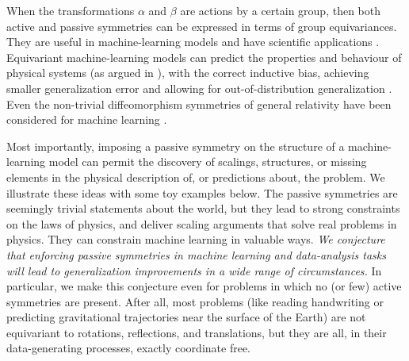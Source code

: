 \documentclass[11pt]{article}
\begin{document}
When the transformations $\alpha$ and $\beta$ are actions by a certain group, then both active and passive symmetries can be expressed in terms of group equivariances.
They are useful in machine-learning models \cite{cohen2016group, kondor2018convolution, thomas2018tensor, geiger2022e3nn, finzi2020generalizing, finzi2021practical} and have scientific applications \cite{batzner20223, musaelian2022learning, stark2022equibind, yu-physics, wang2022approximately}.
Equivariant machine-learning models can predict the properties and behaviour of physical systems (as argued in \cite{cheng2019covariance}), with the correct inductive bias, achieving smaller generalization error \cite{bietti2021sample, elesedy2021provably, elesedy2021kernel, mei2021learning} and allowing for out-of-distribution generalization \cite{villar2022dimensionless}. 
Even the non-trivial diffeomorphism symmetries of general relativity have been considered for machine learning \cite{weiler}.


Most importantly, imposing a passive symmetry on the structure of a machine-learning model can permit the discovery of scalings, structures, or missing elements in the physical description of, or predictions about, the problem.
We illustrate these ideas with some toy examples below.
The passive symmetries are seemingly trivial statements about the world, but they lead to strong constraints on the laws of physics, and deliver scaling arguments that solve real problems in physics.
They can constrain machine learning in valuable ways.
\emph{We conjecture that enforcing passive symmetries in machine learning and data-analysis tasks will lead to generalization improvements in a wide range of circumstances.}
In particular, we make this conjecture even for problems in which no (or few) active symmetries are present.
After all, most problems (like reading handwriting or predicting gravitational trajectories near the surface of the Earth) are not equivariant to rotations, reflections, and translations, but they are all, in their data-generating processes, exactly coordinate free.
\end{document}

